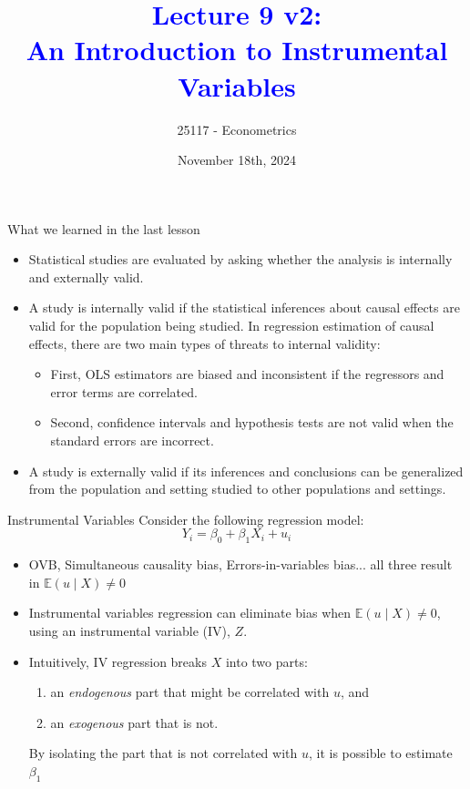 \documentclass[notes,10pt, aspectratio=169]{beamer}
\title[]{\textcolor{blue}{Lecture 9 v2:\\An Introduction to Instrumental Variables}}
\author{25117 - Econometrics}
\institute[shortinst]{Universitat Pompeu Fabra}
\date{November 18th, 2024}
\begin{document}
\begin{frame}[plain]
\maketitle
\end{frame}



\begin{frame}{What we learned in the last lesson}
\begin{itemize}
    \item Statistical studies are evaluated by asking whether the analysis is internally and externally valid.\\[1em]
    \item A study is internally valid if the statistical inferences about causal effects are valid for the population being studied. In regression estimation of causal effects, there are two main types of threats to internal validity:
    \begin{itemize}
        \item First, OLS estimators are biased and inconsistent if the regressors and error terms are correlated.
        \item Second, confidence intervals and hypothesis tests are not valid when the standard errors are incorrect.
    \end{itemize}
    \vspace{1em}
    \item A study is externally valid if its inferences and conclusions can be generalized from the population and setting studied to other populations and settings.
\end{itemize} 
\end{frame}


\begin{frame}{Instrumental Variables}
Consider the following regression model:
\begin{equation*}
    Y_i = \beta_0 + \beta_1 X_i + u_i
\end{equation*}
\begin{itemize}
    \item OVB,  Simultaneous causality bias, Errors-in-variables bias... all three result in $\mathbb{E}(u\mid X)\neq0$\\[1em]
    \item Instrumental variables regression can eliminate bias when $\mathbb{E}(u\mid X)\neq0$, using an instrumental variable (IV), $Z$.\\[1em]
    \item Intuitively, IV regression breaks $X$ into two parts:
    \begin{enumerate}
        \item an \textit{endogenous} part that might be correlated with $u$, and 
        \item an \textit{exogenous}  part that is not. 
    \end{enumerate}
    \vspace{1em}
By isolating the part that is not correlated with $u$, it is possible to estimate $\beta_1$
\end{itemize}
\end{frame}
\end{document}
